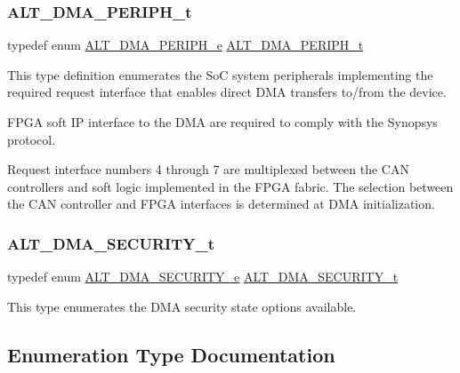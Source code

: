 \subsubsection{\texorpdfstring{ALT\_DMA\_PERIPH\_t}{ALT\_DMA\_PERIPH\_t}}
{\footnotesize\ttfamily typedef enum \mbox{\hyperlink{group__ALT__DMA__COMMON_gad28f2571875df0110325be013606240c}{A\+L\+T\+\_\+\+D\+M\+A\+\_\+\+P\+E\+R\+I\+P\+H\+\_\+e}}
 \mbox{\hyperlink{group__ALT__DMA__COMMON_gae9baf8ac891f0583f9c1c61528cc1736}{A\+L\+T\+\_\+\+D\+M\+A\+\_\+\+P\+E\+R\+I\+P\+H\+\_\+t}}}

This type definition enumerates the SoC system peripherals implementing the required request interface that enables direct D\+MA transfers to/from the device.

F\+P\+GA soft IP interface to the D\+MA are required to comply with the Synopsys protocol.

Request interface numbers 4 through 7 are multiplexed between the C\+AN controllers and soft logic implemented in the F\+P\+GA fabric. The selection between the C\+AN controller and F\+P\+GA interfaces is determined at D\+MA initialization. \mbox{\label{group__ALT__DMA__COMMON_ga59d720d9a72123eca037cc48a734fd7c}} 
\subsubsection{\texorpdfstring{ALT\_DMA\_SECURITY\_t}{ALT\_DMA\_SECURITY\_t}}
{\footnotesize\ttfamily typedef enum \mbox{\hyperlink{group__ALT__DMA__COMMON_ga13d7349f2971e04c8cff4a6c53a19fd8}{A\+L\+T\+\_\+\+D\+M\+A\+\_\+\+S\+E\+C\+U\+R\+I\+T\+Y\+\_\+e}}
 \mbox{\hyperlink{group__ALT__DMA__COMMON_ga59d720d9a72123eca037cc48a734fd7c}{A\+L\+T\+\_\+\+D\+M\+A\+\_\+\+S\+E\+C\+U\+R\+I\+T\+Y\+\_\+t}}}

This type enumerates the D\+MA security state options available. 

\subsection{Enumeration Type Documentation}
\mbox{\label{group__ALT__DMA__COMMON_ga16053f2a9f79090b801843859458a156}} 
